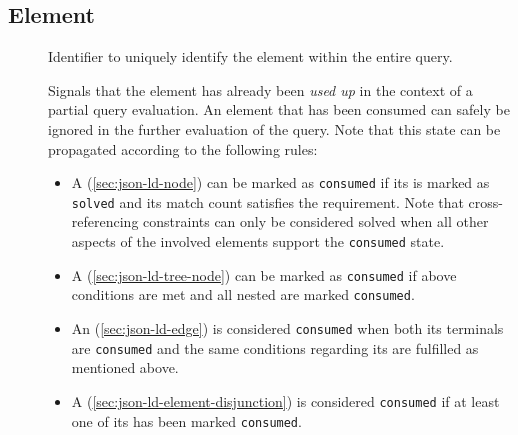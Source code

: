 \documentclass[11pt,a4paper]{article}
\begin{document}
\subsection{Element}
\label{sec:json-ld-element}
\begin{attributes}{}
\end{attributes}
\begin{description}
	\item[] Identifier to uniquely identify the element within the entire query.
	\item[] Signals that the element has already been \textit{used up} in the context of a partial query evaluation. An element that has been consumed can safely be ignored in the further evaluation of the query. Note that this state can be propagated according to the following rules:
	\begin{itemize}[leftmargin=*,topsep=0pt]\compresslist
		\item A (\ref{sec:json-ld-node}) can be marked as \texttt{consumed} if its  is marked as \texttt{solved} and its match count satisfies the  requirement. Note that cross-referencing constraints can only be considered solved when all other aspects of the involved elements support the \texttt{consumed} state.
		\item A (\ref{sec:json-ld-tree-node}) can be marked as \texttt{consumed} if above conditions are met and all nested  are marked \texttt{consumed}.
		\item An (\ref{sec:json-ld-edge}) is considered \texttt{consumed} when both its terminals are \texttt{consumed} and the same conditions regarding its  are fulfilled as mentioned above.
		\item A (\ref{sec:json-ld-element-disjunction}) is considered \texttt{consumed} if at least one of its  has been marked \texttt{consumed}.
	\end{itemize}
\end{description}
\end{document}
